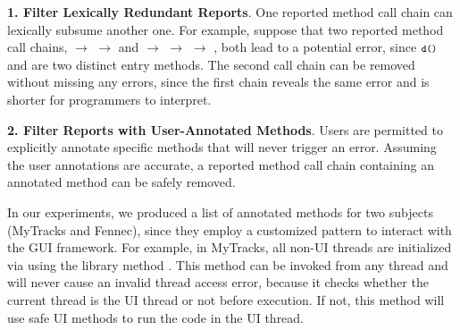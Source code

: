 






\textbf{1. Filter Lexically Redundant Reports}. One reported method call
chain can lexically subsume another one. For example, suppose that two
reported method call chains,  $\rightarrow$ 
$\rightarrow$  and 
 $\rightarrow$  $\rightarrow$  $\rightarrow$ ,
both lead to a potential error, since $\CodeIn{d()}$ and 
are two distinct entry methods. The second call chain can
be removed without missing any errors, since
the first chain reveals the same error and is shorter 
for programmers to interpret.


\textbf{2. Filter Reports with User-Annotated Methods}. Users are
permitted to explicitly annotate specific methods
that will never trigger an error.
Assuming the user annotations are accurate,
a reported method call chain containing an annotated method
can be safely removed. 

In our experiments, 
we produced a list of \filternum annotated methods for two
subjects (MyTracks and Fennec), since they employ a customized pattern
to interact with the GUI framework. For example, in MyTracks, all non-UI
threads are initialized via using the library method .
This method can be invoked from any thread and will never cause an
invalid thread access error, because it checks whether the current
thread is the UI thread or not before execution. If not,
this method will use safe UI methods to run the code in the UI thread.





